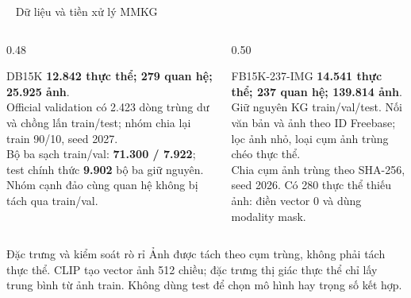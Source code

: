 \documentclass[aspectratio=169,10pt]{beamer}
\newcommand{\leveltag}[2]{%
  \tikz[baseline=(x.base)]{\node[fill=#1,text=white,inner xsep=5pt,inner ysep=1.5pt,
    rounded corners=2pt,font=\scriptsize\bfseries](x){#2};}\ %
}
\begin{document}
\begin{frame}{\leveltag{L2Orange}{CẤP ĐỘ 2} Dữ liệu và tiền xử lý MMKG}
  \begin{columns}[t]
    \begin{column}{0.48\textwidth}
      \begin{block}{DB15K}\footnotesize
        \textbf{12.842 thực thể; 279 quan hệ; 25.925 ảnh}.\\[0.10cm]
        Official validation có 2.423 dòng trùng dư và chồng lấn train/test; nhóm chia lại train 90/10, seed 2027.\\[0.10cm]
        Bộ ba sạch train/val: \textbf{71.300 / 7.922}; test chính thức \textbf{9.902} bộ ba giữ nguyên. Nhóm cạnh đảo cùng quan hệ không bị tách qua train/val.
      \end{block}
    \end{column}
    \begin{column}{0.50\textwidth}
      \begin{block}{FB15K-237-IMG}\footnotesize
        \textbf{14.541 thực thể; 237 quan hệ; 139.814 ảnh}.\\[0.10cm]
        Giữ nguyên KG train/val/test. Nối văn bản và ảnh theo ID Freebase; lọc ảnh nhỏ, loại cụm ảnh trùng chéo thực thể.\\[0.10cm]
        Chia cụm ảnh trùng theo SHA-256, seed 2026. Có 280 thực thể thiếu ảnh: điền vector 0 và dùng modality mask.
      \end{block}
    \end{column}
  \end{columns}
  \begin{exampleblock}{Đặc trưng và kiểm soát rò rỉ}\footnotesize
    Ảnh được tách theo cụm trùng, không phải tách thực thể. CLIP tạo vector ảnh 512 chiều; đặc trưng thị giác thực thể chỉ lấy trung bình từ ảnh train. Không dùng test để chọn mô hình hay trọng số kết hợp.
  \end{exampleblock}
\end{frame}
\end{document}
